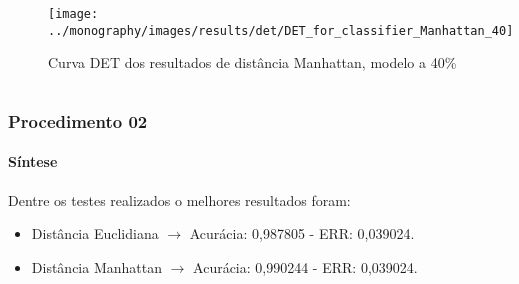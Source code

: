 \begin{frame}
{\begin{columns}
			\begin{figure}
				\centering
				\texttt{[image: ../monography/images/results/det/DET\_for\_classifier\_Manhattan\_40]}
				\caption{Curva DET dos resultados de distância Manhattan, modelo a 40\%}
			\end{figure}
		\end{columns}
	}
\end{frame}

\begin{frame}
	\frametitle{Procedimento 02}
		\framesubtitle{Síntese}
		\par Dentre os testes realizados o melhores resultados foram:
		\begin{itemize}
			\item Distância Euclidiana $\rightarrow$ Acurácia: 0,987805 - ERR: 0,039024.
			\item Distância Manhattan $\rightarrow$ Acurácia: 0,990244 - ERR: 0,039024.
		\end{itemize}
\end{frame}